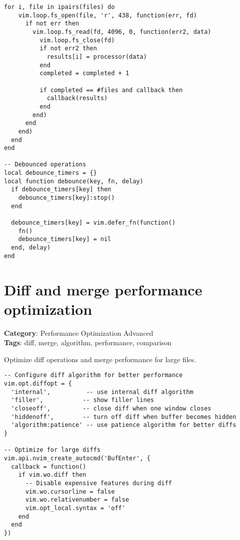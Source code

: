 {{{{{{{{{{\begin{Exa*}{}
\begin{Verbatim}[fontsize=\footnotesize, breaklines, breakanywhere]
  for i, file in ipairs(files) do
    vim.loop.fs_open(file, 'r', 438, function(err, fd)
      if not err then
        vim.loop.fs_read(fd, 4096, 0, function(err2, data)
          vim.loop.fs_close(fd)
          if not err2 then
            results[i] = processor(data)
          end
          completed = completed + 1
          
          if completed == #files and callback then
            callback(results)
          end
        end)
      end
    end)
  end
end

-- Debounced operations
local debounce_timers = {}
local function debounce(key, fn, delay)
  if debounce_timers[key] then
    debounce_timers[key]:stop()
  end
  
  debounce_timers[key] = vim.defer_fn(function()
    fn()
    debounce_timers[key] = nil
  end, delay)
end
\end{Verbatim}
\end{Exa*}

\section{Diff and merge performance optimization}

\textbf{Category}: Performance Optimization Advanced\\ \textbf{Tags}: diff, merge, algorithm, performance, comparison
\vspace{0.5cm}

Optimize diff operations and merge performance for large files.

\begin{Exa*}{}
\begin{Verbatim}[fontsize=\footnotesize, breaklines, breakanywhere]
-- Configure diff algorithm for better performance
vim.opt.diffopt = {
  'internal',          -- use internal diff algorithm
  'filler',           -- show filler lines
  'closeoff',         -- close diff when one window closes
  'hiddenoff',        -- turn off diff when buffer becomes hidden
  'algorithm:patience' -- use patience algorithm for better diffs
}

-- Optimize for large diffs
vim.api.nvim_create_autocmd('BufEnter', {
  callback = function()
    if vim.wo.diff then
      -- Disable expensive features during diff
      vim.wo.cursorline = false
      vim.wo.relativenumber = false
      vim.opt_local.syntax = 'off'
    end
  end
})
\end{Verbatim}
\end{Exa*}

}}}}}}}}}}
